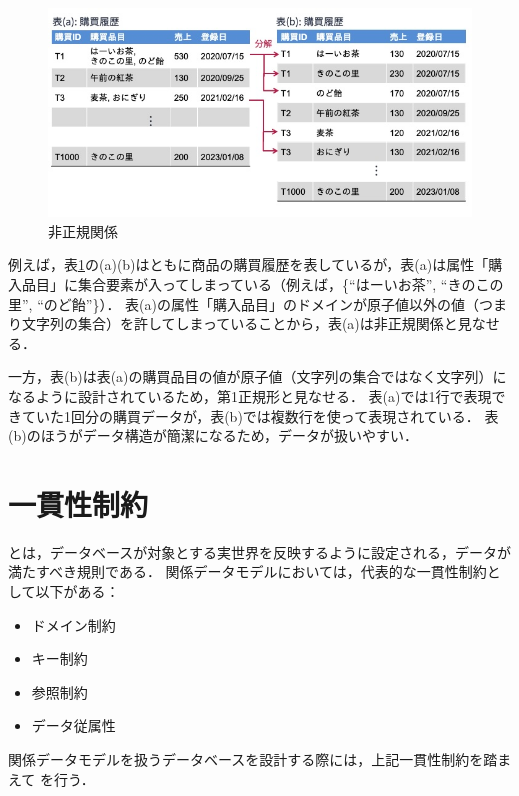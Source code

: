 \begin{figure}[tb]
    \centering
    \includegraphics[width=1.0\textwidth]{figure/unnormalized-relation.jpg}
    \caption{非正規関係}
    \label{fig:unnormalized-relation}
\end{figure}

例えば，表\ref{fig:unnormalized-relation}の(a)(b)はともに商品の購買履歴を表しているが，表(a)は属性「購入品目」に集合要素が入ってしまっている（例えば，\{``はーいお茶'', ``きのこの里'', ``のど飴''\}）．
表(a)の属性「購入品目」のドメインが原子値以外の値（つまり文字列の集合）を許してしまっていることから，表(a)は非正規関係と見なせる．

一方，表(b)は表(a)の購買品目の値が原子値（文字列の集合ではなく文字列）になるように設計されているため，第1正規形と見なせる．
表(a)では1行で表現できていた1回分の購買データが，表(b)では複数行を使って表現されている．
表(b)のほうがデータ構造が簡潔になるため，データが扱いやすい．


\section{一貫性制約}
 とは，データベースが対象とする実世界を反映するように設定される，データが満たすべき規則である．
関係データモデルにおいては，代表的な一貫性制約として以下がある：
\begin{itemize}
\item ドメイン制約
\item キー制約
\item 参照制約
\item データ従属性
\end{itemize}

関係データモデルを扱うデータベースを設計する際には，上記一貫性制約を踏まえて を行う．


